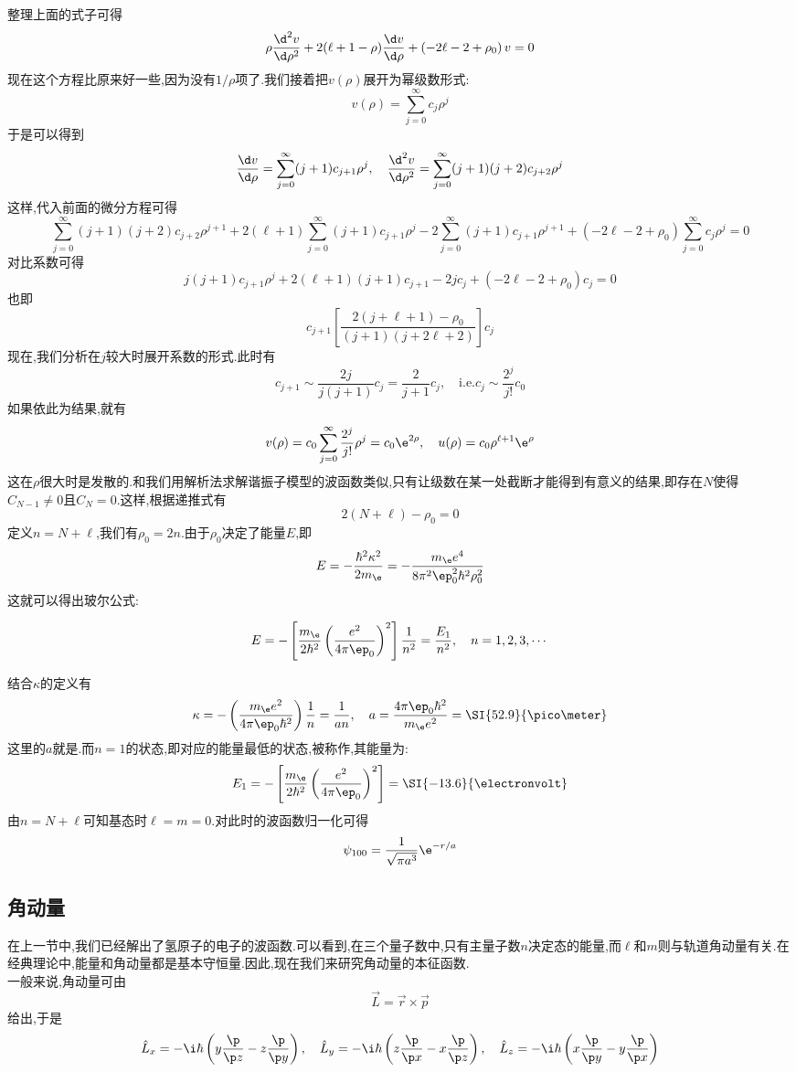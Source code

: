 \documentclass{ctexart}
\begin{document}
整理上面的式子可得
\[\rho\dfrac{\d^2 v}{\d\rho^2}+2(\ell+1-\rho)\dfrac{\d v}{\d\rho}+\left(-2\ell-2+\rho_0\right)v=0\]
\indent 现在这个方程比原来好一些,因为没有$1/\rho$项了.我们接着把$v(\rho)$展开为幂级数形式:
\[v(\rho)=\sum_{j=0}^{\infty}c_j\rho^j\]
于是可以得到
\[\dfrac{\d v}{\d\rho}=\sum_{j=0}^{\infty}(j+1)c_{j+1}\rho^{j},\quad\dfrac{\d^2v}{\d\rho^2}=\sum_{j=0}^{\infty}(j+1)(j+2)c_{j+2}\rho^{j}\]
这样,代入前面的微分方程可得
\[\sum_{j=0}^{\infty}(j+1)(j+2)c_{j+2}\rho^{j+1}+2(\ell+1)\sum_{j=0}^{\infty}(j+1)c_{j+1}\rho^{j}-2\sum_{j=0}^{\infty}(j+1)c_{j+1}\rho^{j+1}+(-2\ell-2+\rho_0)\sum_{j=0}^{\infty}c_j\rho^j=0\]
对比系数可得
\[j(j+1)c_{j+1}\rho^{j}+2(\ell+1)(j+1)c_{j+1}-2jc_j+(-2\ell-2+\rho_0)c_j=0\]
也即
\[c_{j+1}\left[\dfrac{2(j+\ell+1)-\rho_0}{(j+1)(j+2\ell+2)}\right]c_j\]
\indent 现在,我们分析在$j$较大时展开系数的形式.此时有
\[c_{j+1}\sim\dfrac{2j}{j(j+1)}c_j=\dfrac{2}{j+1}c_j,\quad\text{i.e.}c_j\sim\dfrac{2^j}{j!}c_0\]
如果依此为结果,就有
\[v(\rho)=c_0\sum_{j=0}^{\infty}\dfrac{2^j}{j!}\rho^j=c_0\e^{2\rho},\quad u(\rho)=c_0\rho^{\ell+1}\e^{\rho}\]
这在$\rho$很大时是发散的.和我们用解析法求解谐振子模型的波函数类似,只有让级数在某一处截断才能得到有意义的结果,即存在$N$使得$C_{N-1}\neq0$且$C_N=0$.这样,根据递推式有
\[2(N+\ell)-\rho_0=0\]
定义$n=N+\ell$,我们有$\rho_0=2n$.由于$\rho_0$决定了能量$E$,即
\[E=-\dfrac{\hbar^2\kappa^2}{2m_\e}=-\dfrac{m_\e e^4}{8\pi^2\ep_0^2\hbar^2\rho_0^2}\]
这就可以得出玻尔公式:
\begin{theorem}[玻尔公式]
    \[E=-\left[\dfrac{m_\e}{2\hbar^2}\left(\dfrac{e^2}{4\pi\ep_0}\right)^2\right]\dfrac{1}{n^2}=\dfrac{E_1}{n^2},\quad n=1,2,3,\cdots\]
\end{theorem}
结合$\kappa$的定义有
\[\kappa=-\left(\dfrac{m_\e e^2}{4\pi\ep_0\hbar^2}\right)\dfrac1n=\dfrac{1}{an},\quad a=\dfrac{4\pi\ep_0\hbar^2}{m_\e e^2}=\SI{52.9}{\pico\meter}\]
这里的$a$就是.而$n=1$的状态,即对应的能量最低的状态,被称作,其能量为:
\[E_1=-\left[\dfrac{m_\e}{2\hbar^2}\left(\dfrac{e^2}{4\pi\ep_0}\right)^2\right]=\SI{-13.6}{\electronvolt}\]
由$n=N+\ell$可知基态时$\ell=m=0$.对此时的波函数归一化可得
\[\psi_{100}=\dfrac{1}{\sqrt{\pi a^3}}\e^{-r/a}\]
\subsection{角动量}
在上一节中,我们已经解出了氢原子的电子的波函数.可以看到,在三个量子数中,只有主量子数$n$决定态的能量,而$\ell$和$m$则与轨道角动量有关.在经典理论中,能量和角动量都是基本守恒量.因此,现在我们来研究角动量的本征函数.\\
\indent 一般来说,角动量可由
\[\vec{L}=\vec{r}\times\vec{p}\]
给出,于是
\[\hat{L}_x=-\i\hbar\left(y\dfrac{\p}{\p z}-z\dfrac{\p}{\p y}\right),\quad\hat{L}_y=-\i\hbar\left(z\dfrac{\p}{\p x}-x\dfrac{\p}{\p z}\right),\quad\hat{L}_z=-\i\hbar\left(x\dfrac{\p}{\p y}-y\dfrac{\p}{\p x}\right)\]
\end{document}
